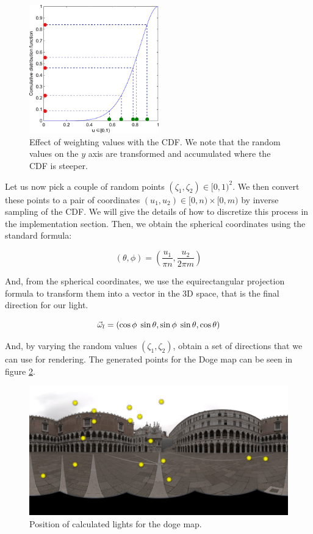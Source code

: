 
\begin{figure}[!ht]
\centering
\includegraphics[width=0.5\textwidth]{images/matlab/cdfex.pdf}
\caption{Effect of weighting values with the CDF. We note that the random values on the $y$ axis are transformed and accumulated where the CDF is steeper.}
\label{fig:cdfweight}
\end{figure}

Let us now pick a couple of random points $(\zeta_1,\zeta_2) \in [0,1)^2$. We then convert these points to a pair of coordinates $(u_1,u_2) \in [0,n)\times[0,m)$ by inverse sampling of the CDF. We will give the details of how to discretize this process in the implementation section. Then, we obtain the spherical coordinates using the standard formula:

$$
(\theta, \phi) = \left(\frac{u_1}{\pi n}, \frac{u_2}{2 \pi m}\right)
$$

And, from the spherical coordinates, we use the equirectangular projection formula to transform them into a vector in the 3D space, that is the final direction for our light.

$$
\vec{\omega}_l = (\cos\phi\;\sin\theta, \sin\phi\;\sin\theta, \cos\theta)
$$

And, by varying the random values $(\zeta_1,\zeta_2)$, obtain a set of directions that we can use for rendering. The generated points for the Doge map can be seen in figure \ref{fig:doge_lights}.


\begin{figure}
\centering
\includegraphics[width=\textwidth]{images/matlab/doge2_lights.png}
\caption{Position of calculated lights for the doge map.}
\label{fig:doge_lights}
\end{figure}